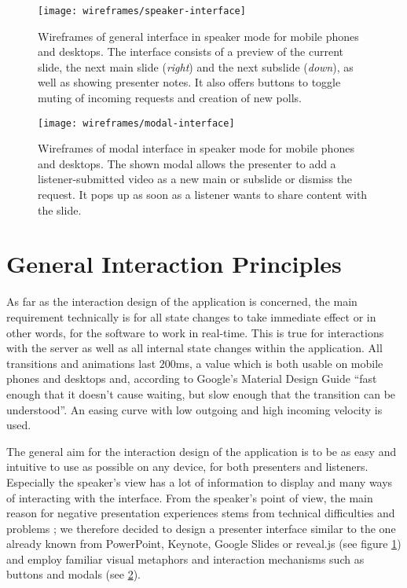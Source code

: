 \begin{figure}
\centering
\texttt{[image: wireframes/speaker-interface]}
\caption{Wireframes of general interface in speaker mode for mobile phones and desktops. The interface consists of a preview of the current slide, the next main slide (\emph{right}) and the next subslide (\emph{down}), as well as showing presenter notes. It also offers buttons to toggle muting of incoming requests and creation of new polls.}
\label{fig:design-interface-presenter}
\end{figure}

\begin{figure}
\centering
\texttt{[image: wireframes/modal-interface]}
\caption{Wireframes of modal interface in speaker mode for mobile phones and desktops. The shown modal allows the presenter to add a listener-submitted video as a new main or subslide or dismiss the request. It pops up as soon as a listener wants to share content with the slide.}
\label{fig:design-interface-modal}
\end{figure}

\section{General Interaction Principles}
As far as the interaction design of the application is concerned, the main requirement technically is for all state changes to take immediate effect or in other words, for the software to work in real-time. This is true for interactions with the server as well as all internal state changes within the application. All transitions and animations last $200$ms, a value which is both usable on mobile phones and desktops and, according to Google's Material Design Guide \cite{GoogleMaterialDesignGuide} ``fast enough that it doesn't cause waiting, but slow enough that the transition can be understood''. An easing curve with low outgoing and high incoming velocity is used.

The general aim for the interaction design of the application is to be as easy and intuitive to use as possible on any device, for both presenters and listeners. Especially the speaker's view has a lot of information to display and many ways of interacting with the interface. From the speaker's point of view, the main reason for negative presentation experiences stems from technical difficulties and problems \cite{Wacker:PresenterExperience}; we therefore decided to design a presenter interface similar to the one already known from PowerPoint, Keynote, Google Slides or reveal.js (see figure \ref{fig:design-interface-presenter}) and employ familiar visual metaphors and interaction mechanisms such as buttons and modals (see \ref{fig:design-interface-modal}).

